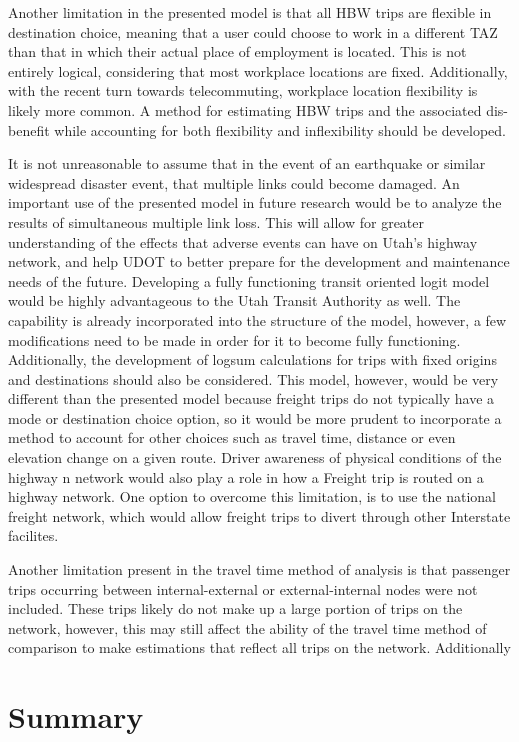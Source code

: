 Another limitation in the presented model is that all HBW trips are flexible in
destination choice, meaning that a user could choose to work in a different
TAZ than that in which their actual place of employment is located. This is
not entirely logical, considering that most workplace locations are fixed. Additionally,
with the recent turn towards telecommuting, workplace location flexibility is
likely more common. A method for estimating HBW trips and the associated dis-benefit
while accounting for both flexibility and inflexibility should be developed.

It is not unreasonable to assume that in the event of an earthquake or
similar widespread disaster event, that multiple links could become
damaged. An important use of the presented model in future research would be
to analyze the results of simultaneous multiple link
loss. This will allow for
greater understanding of the effects that adverse events can have on Utah’s
highway network, and help UDOT to better prepare for the development and
maintenance needs of the future. Developing a fully functioning transit oriented logit model
would be highly advantageous to the Utah Transit Authority as well. The capability
is already incorporated into the structure of the model, however, a few modifications
need to be made in order for it to become fully functioning.
Additionally, the development of logsum calculations for trips with fixed
origins and destinations should also be considered. This model, however,
would be very different than the presented model because freight trips
do not typically have a mode or destination choice option, so it would be
more prudent to incorporate a method to account for other choices such as travel time,
distance or even elevation change on a given route. Driver awareness of physical
conditions of the highway n network would also play a role in how a Freight trip
is routed on a highway network. One option to overcome this limitation, is to use the national
freight network, which would allow freight trips to divert through other Interstate
facilites.

Another limitation present in the travel time method of analysis is that passenger
trips occurring between internal-external or external-internal nodes were not
included. These trips likely do not make up a large portion of trips on the network,
however, this may still affect the ability of the travel time method of comparison
to make estimations that reflect all trips on the network. Additionally

\section{Summary}

